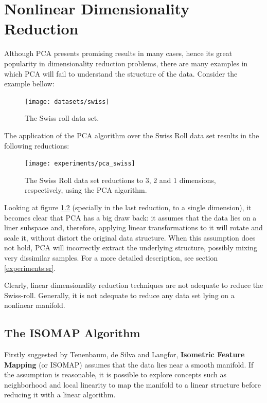 \chapter{Nonlinear Dimensionality Reduction}

Although PCA presents promising results in many cases, hence its great popularity in dimensionality reduction problems, there are many examples in which PCA will fail to understand the structure of the data. Consider the example bellow:

\begin{figure}[H]
	\centering
	\captionsetup{justification=centering}
	
	\texttt{[image: datasets/swiss]}
	\caption{The Swiss roll data set.}
	\label{fig:dsswiss}
\end{figure}

The application of the PCA algorithm over the Swiss Roll data set results in the following reductions:

\begin{figure}[H]
	\centering
	\captionsetup{justification=centering}

	\texttt{[image: experiments/pca\_swiss]}
	\caption{The Swiss Roll data set reductions to 3, 2 and 1 dimensions, respectively, using the PCA algorithm.}
	\label{fig:swiss_pca}
\end{figure}

Looking at figure \ref{fig:swiss_pca} (specially in the last reduction, to a single dimension), it becomes clear that PCA has a big draw back: it assumes that the data lies on a liner subspace \cite{cay2005} and, therefore, applying linear transformations to it will rotate and scale it, without distort the original data structure. When this assumption does not hold, PCA will incorrectly extract the underlying structure, possibly mixing very dissimilar samples. For a more detailed description, see section \ref{experiments:sr}.

Clearly, linear dimensionality reduction techniques are not adequate to reduce the Swiss-roll. Generally, it is not adequate to reduce any data set lying on a nonlinear manifold.

\section{The ISOMAP Algorithm}

Firstly suggested by Tenenbaum, de Silva and Langfor, \textbf{Isometric Feature Mapping} (or ISOMAP) assumes that the data lies near a smooth manifold. If the assumption is reasonable, it is possible to explore concepts such as neighborhood and local linearity to map the manifold to a linear structure before reducing it with a linear algorithm.

